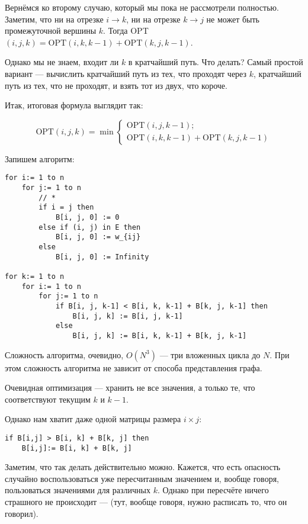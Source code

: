 Вернёмся ко второму случаю, который мы пока не рассмотрели полностью. Заметим, что ни на отрезке $i \longrightarrow k$, ни на отрезке $k \longrightarrow j$ не может быть промежуточной вершины $k$. Тогда OPT$(i, j, k) = \mathrm{OPT}(i, k, k-1) + \mathrm{OPT}(k, j, k-1)$.

Однако мы не знаем, входит ли $k$ в кратчайший путь. Что делать? Самый простой вариант --- вычислить кратчайший путь из тех, что проходят через $k$, кратчайший путь из тех, что не проходят, и взять тот из двух, что короче.

Итак, итоговая формула выглядит так:

\[
    \mathrm{OPT}(i, j, k) = \min
    \begin{cases}
        \mathrm{OPT}(i, j, k-1); \\
        \mathrm{OPT}(i, k, k-1) + \mathrm{OPT}(k, j, k-1)
    \end{cases}
\]

Запишем алгоритм:

\begin{lstlisting}
for i:= 1 to n
    for j:= 1 to n
        // *
        if i = j then
            B[i, j, 0] := 0
        else if (i, j) in E then
            B[i, j, 0] := w_{ij}
        else
            B[i, j, 0] := Infinity

for k:= 1 to n
    for i:= 1 to n
        for j:= 1 to n
            if B[i, j, k-1] < B[i, k, k-1] + B[k, j, k-1] then
                B[i, j, k] := B[i, j, k-1]
            else
                B[i, j, k] := B[i, k, k-1] + B[k, j, k-1]
\end{lstlisting}

Сложность алгоритма, очевидно, $O(N^3)$ --- три вложенных цикла до $N$. При этом сложность алгоритма не зависит от способа представления графа.

Очевидная оптимизация --- хранить не все значения, а только те, что соответствуют текущим $k$ и $k-1$.

Однако нам хватит даже одной матрицы размера $i\times j$:

\begin{lstlisting}
if B[i,j] > B[i, k] + B[k, j] then
    B[i,j]:= B[i, k] + B[k, j]
\end{lstlisting}

Заметим, что так делать действительно можно. Кажется, что есть опасность случайно воспользоваться уже пересчитанным значением и, вообще говоря, пользоваться значениями для различных $k$. Однако при пересчёте ничего страшного не происходит --- (тут, вообще говоря, нужно расписать то, что он говорил).

